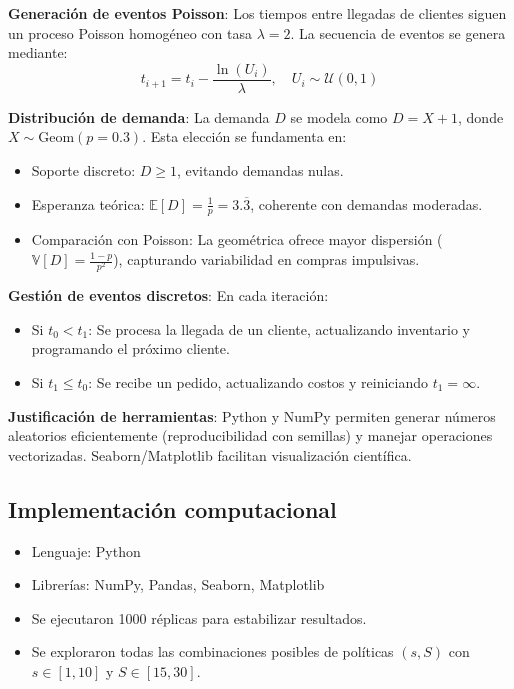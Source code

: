 \documentclass{report}
\begin{document}
\textbf{Generación de eventos Poisson}:  
Los tiempos entre llegadas de clientes siguen un proceso Poisson homogéneo con tasa \(\lambda = 2\). 
La secuencia de eventos se genera mediante:  
\[
t_{i+1} = t_i - \frac{\ln(U_i)}{\lambda}, \quad U_i \sim \mathcal{U}(0,1)
\]


\textbf{Distribución de demanda}:  
La demanda \(D\) se modela como \(D = X + 1\), donde \(X \sim \text{Geom}(p=0.3)\). Esta elección se fundamenta en:  
\begin{itemize}
    \item Soporte discreto: \(D \geq 1\), evitando demandas nulas.
    \item Esperanza teórica: \(\mathbb{E}[D] = \frac{1}{p} = 3.\overline{3}\), coherente con demandas moderadas.
    \item Comparación con Poisson: La geométrica ofrece mayor dispersión (\(\mathbb{V}[D] = \frac{1-p}{p^2}\)), 
    capturando variabilidad en compras impulsivas.
\end{itemize} 

\textbf{Gestión de eventos discretos}:  
En cada iteración:  
\begin{itemize}  
\item Si \(t_0 < t_1\): Se procesa la llegada de un cliente, actualizando inventario y programando el próximo cliente.  
\item Si \(t_1 \leq t_0\): Se recibe un pedido, actualizando costos y reiniciando \(t_1 = \infty\).  
\end{itemize}  

\textbf{Justificación de herramientas}:  
Python y NumPy permiten generar números aleatorios eficientemente (reproducibilidad con semillas) y manejar operaciones vectorizadas. Seaborn/Matplotlib facilitan visualización científica.  


\subsection*{Implementación computacional}

\begin{itemize}
\item Lenguaje: Python
\item Librerías: NumPy, Pandas, Seaborn, Matplotlib
\item Se ejecutaron 1000 réplicas para estabilizar resultados.
\item Se exploraron todas las combinaciones posibles de políticas \((s, S)\) con 
$ s \in [1, 10] $ y $ S \in [15, 30] $.
\end{itemize}
\end{document}
